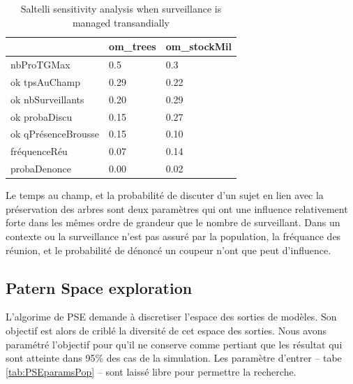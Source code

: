 \documentclass{article}
\begin{document}
        \begin{table}
            \centering\begingroup\fontsize{10}{12}\selectfont
                \begin{tabular}[]{lll}
                        \toprule
                        ~ & om\_trees & om\_stockMil\\
                        \hline
                        \addlinespace
                        nbProTGMax & 0.5 & 0.3\\ ok
                        tpsAuChamp & 0.29 & 0.22\\ ok
                        nbSurveillants & 0.20 & 0.29\\ ok
                        probaDiscu & 0.15 & 0.27\\ ok
                        qPrésenceBrousse & 0.15 & 0.10\\
                        fréquenceRéu & 0.07 & 0.14\\
                        probaDenonce & 0.00 & 0.02\\
                        \bottomrule
                \end{tabular}
                \caption{Saltelli sensitivity analysis when surveillance is managed transandially}
                \label{tab:saltelliReprz}
            \endgroup{}
        \end{table}

        Le temps au champ, et la probabilité de discuter d'un sujet en lien avec la préservation des arbres sont deux paramètres qui ont une influence relativement forte dans les mêmes ordre de grandeur que le nombre de surveillant. Dans un contexte ou la surveillance n'est pas assuré par la population, la fréquance des réunion, et le probabilité de dénoncé un coupeur n'ont que peut d'influence.

    \subsection{Patern Space exploration}

    L'algorime de PSE demande à discretiser l'espace des sorties de modèles. Son objectif est alors de criblé la diversité de cet espace des sorties. Nous avons paramétré l'objectif pour qu'il ne conserve comme pertiant que les résultat qui sont atteinte dans 95\% des cas de la simulation. Les paramètre d'entrer -- tabe \ref{tab:PSEparamsPop} -- sont laissé libre pour permettre la recherche.\\
    
\end{document}
